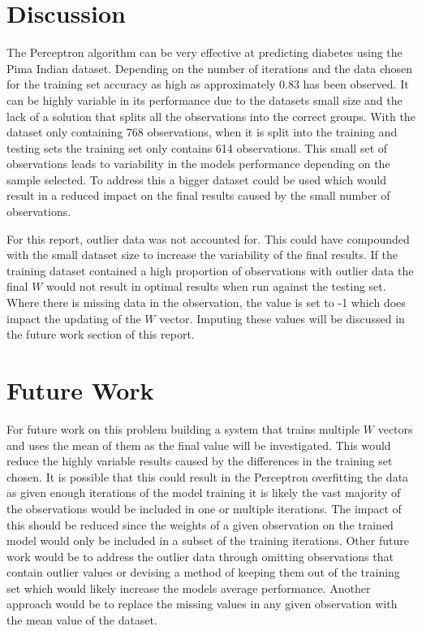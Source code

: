 \documentclass[10pt,twocolumn,letterpaper]{article}
\begin{document}
\section{Discussion}
The Perceptron algorithm can be very effective at predicting diabetes using the Pima Indian dataset. Depending
on the number of iterations and the data chosen for the training set accuracy as high as  approximately 0.83
has been observed. It can be highly variable in its performance due to the datasets small size and the lack
of a solution that splits all the observations into the correct groups. With the dataset only containing 768
observations, when it is split into the training and testing sets the training set only contains 614 observations.
This small set of observations leads to variability in the models performance depending on the sample selected.
To address this a bigger dataset could be used which would result in a reduced impact on the final results
caused by the small number of observations.

For this report, outlier data was not accounted for. This could have compounded with the small dataset size
to increase the variability of the final results. If the training dataset contained a high proportion of
observations with outlier data the final $W$ would not result in optimal results when run against the testing
set. Where there is missing data in the observation, the value is set to -1 which does impact the updating
of the $W$ vector. Imputing these values will be discussed in the future work section of this report.

\section{Future Work}
For future work on this problem building a system that trains multiple $W$ vectors and uses the mean of them
as the final value will be investigated. This would reduce the highly variable results caused by the differences
in the training set chosen. It is possible that this could result in the Perceptron overfitting the data
as given enough iterations of the model training it is likely the vast majority of the observations would
be included in one or multiple iterations. The impact of this should be reduced since the weights of a given
observation on the trained model would only be included in a subset of the training iterations. Other future work
would be to address the outlier data through omitting observations that
contain outlier values or devising a method of keeping them out of the training set which would likely
increase the models average performance. Another approach would be to replace the missing values in any
given observation with the mean value of the dataset.
\end{document}
